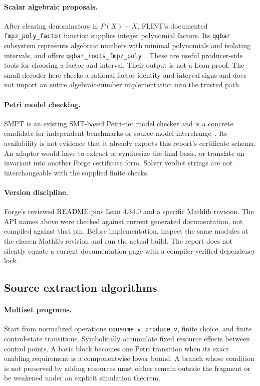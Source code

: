 \documentclass[11pt,a4paper]{article}
\theoremstyle{definition}\newtheorem{definition}[theorem]{Definition}
\theoremstyle{remark}\newtheorem{remark}[theorem]{Remark}
\newcommand{\code}[1]{\nolinkurl{#1}}
\begin{document}
\paragraph{Scalar algebraic proposals.}
After clearing denominators in $P(X)-X$, FLINT's documented \code{fmpz_poly_factor} function supplies integer polynomial factors. Its \code{qqbar} subsystem represents algebraic numbers with minimal polynomials and isolating intervals, and offers \code{qqbar_roots_fmpz_poly}~\cite{flint-factor,flint-qqbar}. These are useful producer-side tools for choosing a factor and interval. Their output is not a Lean proof. The small decoder here checks a rational factor identity and interval signs and does not import an entire algebraic-number implementation into the trusted path.

\paragraph{Petri model checking.}
SMPT is an existing SMT-based Petri-net model checker and is a concrete candidate for independent benchmarks or source-model interchange~\cite{smpt}. Its availability is not evidence that it already exports this report's certificate schema. An adapter would have to extract or synthesize the final basis, or translate an invariant into another Forge certificate form. Solver verdict strings are not interchangeable with the supplied finite checks.

\paragraph{Version discipline.}
Forge's reviewed README pins Lean 4.34.0 and a specific Mathlib revision. The API names above were checked against current generated documentation, not compiled against that pin. Before implementation, inspect the same modules at the chosen Mathlib revision and run the actual build. The report does not silently equate a current documentation page with a compiler-verified dependency lock.

\subsection{Source extraction algorithms}
\paragraph{Multiset programs.}
Start from normalized operations \code{consume v}, \code{produce v}, finite choice, and finite control-state transitions. Symbolically accumulate fixed resource effects between control points. A basic block becomes one Petri transition when its exact enabling requirement is a componentwise lower bound. A branch whose condition is not preserved by adding resources must either remain outside the fragment or be weakened under an explicit simulation theorem.
\end{document}
